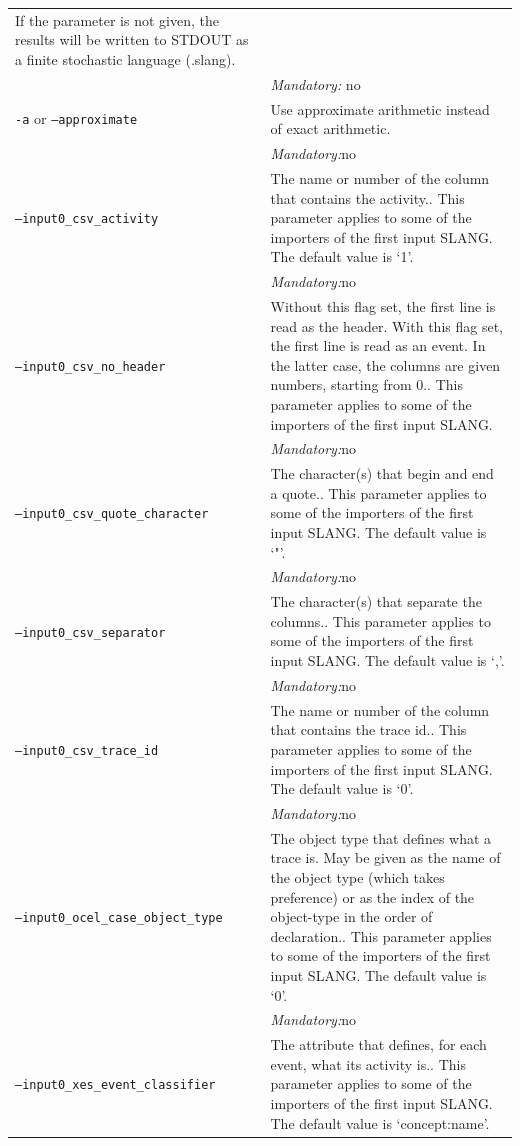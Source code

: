 {\begin{tabularx}{\linewidth}{lX}
If the parameter is not given, the results will be written to STDOUT as a finite stochastic language (.slang).\\
&\textit{Mandatory:} \quad no\\
\texttt{-a} or \texttt{--approximate} & Use approximate arithmetic instead of exact arithmetic.\\
&\textit{Mandatory:}\quad no\\
\texttt{--input0\_csv\_activity} & The name or number of the column that contains the activity.. This parameter applies to some of the importers of the first input SLANG. The default value is `1'.\\
&\textit{Mandatory:}\quad no\\
\texttt{--input0\_csv\_no\_header} & Without this flag set, the first line is read as the header. 
    With this flag set, the first line is read as an event. In the latter case, the columns are given numbers, starting from 0.. This parameter applies to some of the importers of the first input SLANG. \\
&\textit{Mandatory:}\quad no\\
\texttt{--input0\_csv\_quote\_character} & The character(s) that begin and end a quote.. This parameter applies to some of the importers of the first input SLANG. The default value is `"'.\\
&\textit{Mandatory:}\quad no\\
\texttt{--input0\_csv\_separator} & The character(s) that separate the columns.. This parameter applies to some of the importers of the first input SLANG. The default value is `,'.\\
&\textit{Mandatory:}\quad no\\
\texttt{--input0\_csv\_trace\_id} & The name or number of the column that contains the trace id.. This parameter applies to some of the importers of the first input SLANG. The default value is `0'.\\
&\textit{Mandatory:}\quad no\\
\texttt{--input0\_ocel\_case\_object\_type} & The object type that defines what a trace is. May be given as the name of the object type (which takes preference) or as the index of the object-type in the order of declaration.. This parameter applies to some of the importers of the first input SLANG. The default value is `0'.\\
&\textit{Mandatory:}\quad no\\
\texttt{--input0\_xes\_event\_classifier} & The attribute that defines, for each event, what its activity is.. This parameter applies to some of the importers of the first input SLANG. The default value is `concept:name'.\\

\end{tabularx}}
